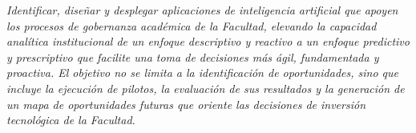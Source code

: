 \documentclass[11pt,a4paper]{scrreprt}
\begin{document}
\newpage
{}
{\small\color{mutedcolor}\itshape Identificar, diseñar y desplegar aplicaciones de inteligencia artificial que apoyen los procesos de gobernanza académica de la Facultad, elevando la capacidad analítica institucional de un enfoque descriptivo y reactivo a un enfoque predictivo y prescriptivo que facilite una toma de decisiones más ágil, fundamentada y proactiva. El objetivo no se limita a la identificación de oportunidades, sino que incluye la ejecución de pilotos, la evaluación de sus resultados y la generación de un mapa de oportunidades futuras que oriente las decisiones de inversión tecnológica de la Facultad.}\par\vspace{6pt}
\end{document}
